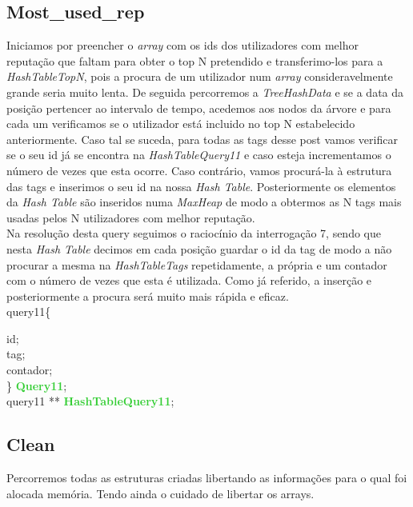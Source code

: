 \documentclass[10pt,a4paper]{article}
\begin{document}
{\subsection{Most\_used\_rep} 
Iniciamos por preencher o \textit{array} com os ids dos utilizadores com melhor reputação que faltam para obter o top N pretendido e transferimo-los para a \textit{HashTableTopN}, pois a procura de um utilizador num \textit{array} consideravelmente grande seria muito lenta. De seguida percorremos a \textit{TreeHashData} e se a data da posição pertencer ao intervalo de tempo, acedemos aos nodos da árvore e para cada um verificamos se o utilizador está incluido no top N estabelecido anteriormente. Caso tal se suceda, para todas as tags desse post vamos verificar se o seu id já se encontra na \textit{HashTableQuery11} e caso esteja incrementamos o número de vezes que esta ocorre. Caso contrário, vamos procurá-la à estrutura das tags e inserimos o seu id na nossa \textit{Hash Table}. Posteriormente os elementos da \textit{Hash Table} são inseridos numa \textit{MaxHeap} de modo a obtermos as N tags mais usadas pelos N utilizadores com melhor reputação.\\
\indent Na resolução desta query seguimos o raciocínio da interrogação 7, sendo que nesta \textit{Hash Table} decimos em cada posição guardar o id da tag de modo a não procurar a mesma na \textit{HashTableTags} repetidamente, a própria e um contador com o número de vezes que esta é utilizada. Como já referido, a inserção e posteriormente a procura será muito mais rápida e eficaz.\\

\noindent {\bf{\textcolor{Emerald}{typedef struct}}} query11\{\\
    \indent {\bf{\textcolor{Emerald}{long}}}} id;\\
    \indent {\bf{\textcolor{Emerald}{char*}}} tag;\\
    \indent {\bf{\textcolor{Emerald}{long}}} contador;\\
\} {\bf{\textcolor{LimeGreen}{Query11}}};\\

\noindent {\bf{\textcolor{Emerald}{typedef struct}}} query11 ** {\bf{\textcolor{LimeGreen}{HashTableQuery11}}};

\subsection{Clean} 
Percorremos todas as estruturas criadas libertando as informações para o qual foi alocada memória. Tendo ainda o cuidado de libertar os arrays.
\end{document}
